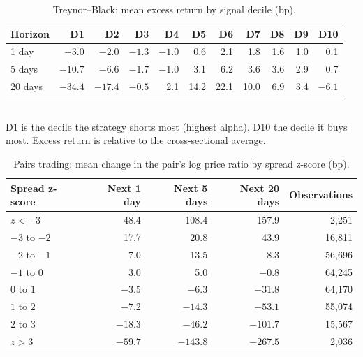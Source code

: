 \documentclass[12pt,letterpaper]{article}
\begin{document}
\begin{table}[H]
\centering
\caption{Treynor--Black: mean excess return by signal decile (bp).}
\label{tab:calibration-tb}
\begin{tabular}{lrrrrrrrrrr}
\toprule
Horizon & D1 & D2 & D3 & D4 & D5 & D6 & D7 & D8 & D9 & D10 \\
\midrule
1 day & $-3.0$ & $-2.0$ & $-1.3$ & $-1.0$ & 0.6 & 2.1 & 1.8 & 1.6 & 1.0 & 0.1 \\
5 days & $-10.7$ & $-6.6$ & $-1.7$ & $-1.0$ & 3.1 & 6.2 & 3.6 & 3.6 & 2.9 & 0.7 \\
20 days & $-34.4$ & $-17.4$ & $-0.5$ & 2.1 & 14.2 & 22.1 & 10.0 & 6.9 & 3.4 & $-6.1$ \\
\bottomrule
\end{tabular}
\\[4pt]
\small D1 is the decile the strategy shorts most (highest alpha), D10 the decile it buys most. Excess return is relative to the cross-sectional average.
\end{table}

\begin{table}[H]
\centering
\caption{Pairs trading: mean change in the pair's log price ratio by spread z-score (bp).}
\label{tab:calibration-pairs}
\begin{tabular}{lrrrr}
\toprule
Spread z-score & Next 1 day & Next 5 days & Next 20 days & Observations \\
\midrule
$z < -3$ & 48.4 & 108.4 & 157.9 & 2,251 \\
$-3$ to $-2$ & 17.7 & 20.8 & 43.9 & 16,811 \\
$-2$ to $-1$ & 7.0 & 13.5 & 8.3 & 56,696 \\
$-1$ to $0$ & 3.0 & 5.0 & $-0.8$ & 64,245 \\
$0$ to $1$ & $-3.5$ & $-6.3$ & $-31.8$ & 64,170 \\
$1$ to $2$ & $-7.2$ & $-14.3$ & $-53.1$ & 55,074 \\
$2$ to $3$ & $-18.3$ & $-46.2$ & $-101.7$ & 15,567 \\
$z > 3$ & $-59.7$ & $-143.8$ & $-267.5$ & 2,036 \\
\bottomrule
\end{tabular}
\end{table}
\end{document}
